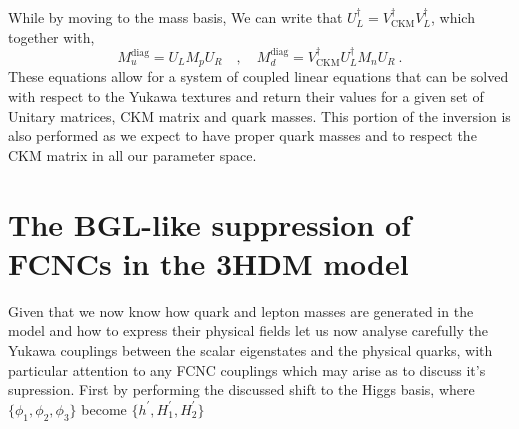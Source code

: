 %
While by moving to the mass basis, 
%
We can write that $U_L^\dagger = V^\dagger_{\text{CKM}} V_L^\dagger$, which together with,
\begin{equation}
M_u^{\text{diag}}  = U_L M_p U_R  \quad , \quad M_d^{\text{diag}}  = V^\dagger_{\text{CKM}} U_L^\dagger M_n U_R \ . 
\end{equation} 
%
These equations allow for a system of coupled linear equations that can be solved with respect to the Yukawa textures and return their values for a given set of Unitary matrices, CKM matrix and quark masses. 
%
This portion of the inversion is also performed as we expect to have proper quark masses and to respect the CKM matrix in all our parameter space.
% 

\section{The BGL-like suppression of FCNCs in the 3HDM model}

Given that we now know how quark and lepton masses are generated in the model and how to express their physical fields let us now analyse carefully the Yukawa couplings between the scalar eigenstates and the physical quarks, with particular attention to any FCNC couplings which may arise as to discuss it's supression.
%
First by performing the discussed shift to the Higgs basis, where $\{\phi_1 , \phi_2 , \phi_3\}$ become $\{h^\prime , H_1^\prime , H_2^\prime \}$ 

